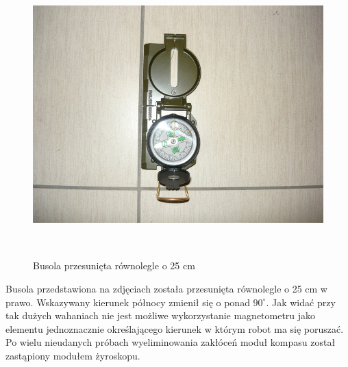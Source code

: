 \begin{figure}[!ht]
 \centering
 \includegraphics[height=110mm]{../images/ch04/compass02.jpg}
 \caption{Busola przesunięta równolegle o 25 cm}
 \label{fig:Busola2}
\end{figure}

Busola przedstawiona na zdjęciach została
przesunięta równolegle o 25 cm w prawo. Wskazywany kierunek północy zmienił się o
ponad $90^{\circ}$. Jak widać przy tak dużych wahaniach nie jest możliwe
wykorzystanie magnetometru jako elementu jednoznacznie określającego kierunek w
którym robot ma się poruszać. Po wielu nieudanych próbach wyeliminowania zakłóceń
moduł kompasu został zastąpiony modułem żyroskopu.


